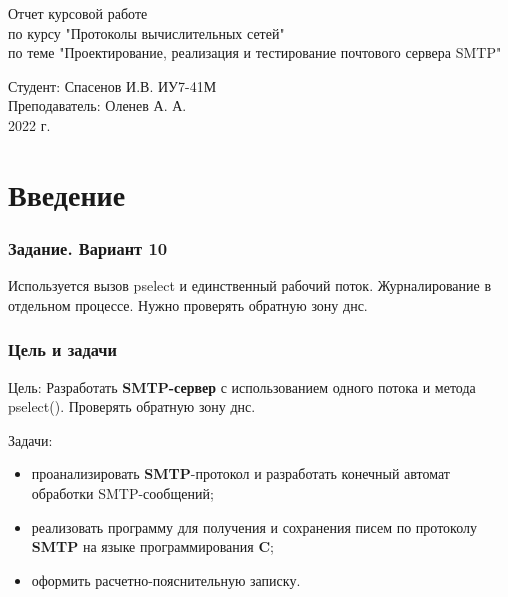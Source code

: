 \documentclass[a4paper,12pt]{report}
\begin{document}
	\begin{titlepage}
		\begin{center}
			\begin{LARGE}
				Отчет курсовой работе\\
					по курсу "Протоколы вычислительных сетей"\\
					по теме "Проектирование, реализация и тестирование почтового сервера SMTP"
			\end{LARGE}
		
			\begin{Large}
				\vspace{5cm}
				Студент: Спасенов И.В. ИУ7-41М\\
					Преподаватель: Оленев А. А. \\
				
				\vspace{10cm}2022 г.				   
			\end{Large}
			
		\end{center}
		 
	\end{titlepage}

\tableofcontents

\chapter*{Введение}


\subsection*{Задание. Вариант 10}

Используется вызов pselect и единственный рабочий поток. Журналирование в отдельном процессе. Нужно проверять обратную зону днс.

\subsection*{Цель и задачи}

Цель:
    Разработать \textbf{SMTP-сервер} с использованием одного потока и метода pselect(). Проверять обратную зону днс.

Задачи:
\begin{itemize}
    \item проанализировать \textbf{SMTP}-протокол и разработать конечный автомат обработки SMTP-сообщений;
    \item реализовать программу для получения и сохранения писем по протоколу \textbf{SMTP} на языке программирования \textbf{C};
    \item оформить расчетно-пояснительную записку.
\end{itemize}
\end{document}
